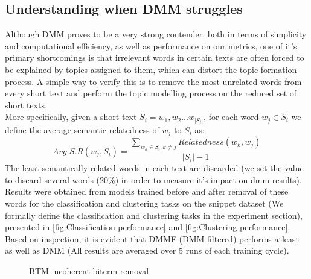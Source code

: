\documentclass{sig-alternate-05-2015}
\begin{document}
\subsection{Understanding when DMM struggles}
Although DMM proves to be a very strong contender, both in terms of simplicity and computational efficiency, as well as performance on our metrics, one of it's primary shortcomings is that irrelevant words in certain texts are often forced to be explained by topics assigned to them, which can distort the topic formation process. A simple way to verify this is to remove the most unrelated words from every short text and perform the topic modelling process on the reduced set of short texts.
\\[10pt]
More specifically, given a short text $S_{i} = {w_1, w_2 ... w_{|S_{i}|}}$, for each word $w_{j} \in S_{i}$ we define the average semantic relatedness of $w_{j}$ to $S_{i}$ as:
$$Avg.S.R(w_{j}, S_{i}) = \frac{\sum_{w_{k} \in S_{i}, k \neq j}Relatedness(w_{k}, w_{j})}{|S_{i}|-1}$$
The least semantically related words in each text are discarded (we set the value to discard several words (20\%) in order to measure it's impact on dmm results). Results were obtained from models trained before and after removal of these words for the classification and clustering tasks on the snippet dataset (We formally define the classification and clustering tasks in the experiment section), presented in \ref{fig:Classification performance} and \ref{fig:Clustering performance}.\\[10pt]
Based on inspection, it is evident that DMMF (DMM filtered) performs atleast as well as DMM (All results are averaged over 5 runs of each training cycle).
\begin{figure}[t!]
    \centering
    \caption{BTM incoherent biterm removal}
\end{figure}
\end{document}
